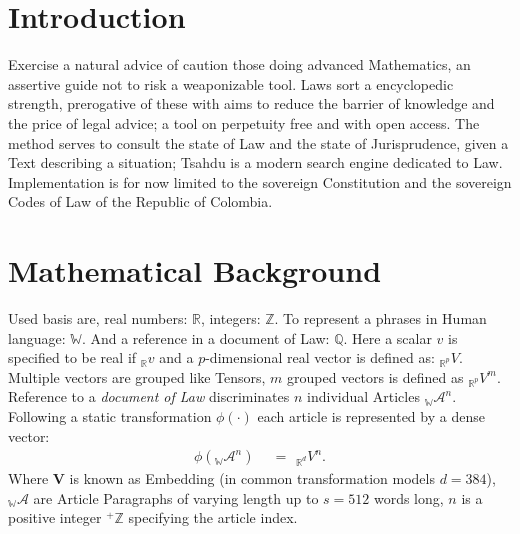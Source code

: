 \documentclass[a4paper,fleqn]{cas-sc}
\begin{document}
 \maketitle

\section{Introduction}
Exercise a natural advice of caution those doing advanced Mathematics, an assertive guide not to risk a weaponizable tool. 
Laws sort a encyclopedic strength, prerogative of these with aims to reduce the barrier of 
knowledge and the price of legal advice; a tool on perpetuity free and with open access. 
\noindent
The method serves to consult the state of Law and the state of Jurisprudence, 
given a Text describing a situation; Tsahdu is a modern search engine dedicated to Law. 
Implementation is for now limited to the sovereign Constitution and the sovereign Codes of Law of the Republic of Colombia. 

\section{Mathematical Background}
Used basis are, real numbers: $\mathbb{R}$, integers: $\mathbb{Z}$. To represent a phrases in Human language: $\mathbb{W}$. 
And a reference in a document of Law: $\mathbb{Q}$. Here a scalar $v$ is specified to be real if ${}_{\mathbb{R}}v$ and a 
$p$-dimensional real vector is defined as: ${}_{\mathbb{R}^{p}}V$. Multiple vectors are grouped like Tensors, 
$m$ grouped vectors is defined as ${}_{\mathbb{R}^{p}}V^{m}$.\\
\noindent
Reference to a \textit{document of Law} discriminates $n$ individual Articles ${}_{\mathbb{W}}\mathcal{A}^{n}$. \\

\noindent
Following a static transformation $\phi{}(\cdot)$ each article is represented by a dense vector: 
\begin{equation}
  \begin{split}
    \phi({}_{\mathbb{W}}\mathcal{A}^{n}) \hspace{5pt} &= \hspace{5pt} {}_{\mathbb{R}^{d}}V^{n}.
  \end{split}
\end{equation}
\noindent
Where $\mathbf{V}$ is known as Embedding (in common transformation models $d=384$), 
${}_{\mathbb{W}}\mathcal{A}$ are Article Paragraphs of varying length up to $s=512$ words long, 
$n$ is a positive integer ${}^{+}\mathbb{Z}$ specifying the article index. \\
\end{document}
